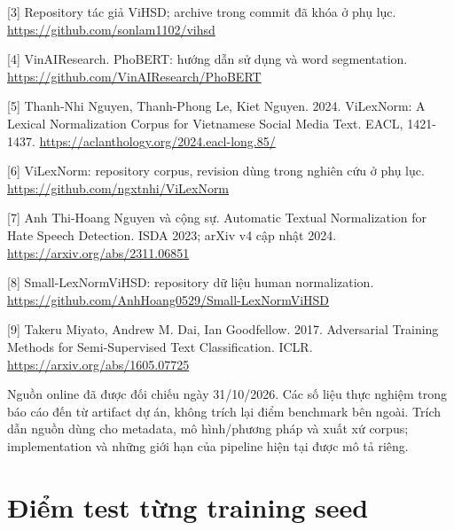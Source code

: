\documentclass[11pt,a4paper]{article}
\begin{document}
[3] Repository tác giả ViHSD; archive trong commit đã khóa ở phụ lục. \url{https://github.com/sonlam1102/vihsd}


[4] VinAIResearch. PhoBERT: hướng dẫn sử dụng và word segmentation. \url{https://github.com/VinAIResearch/PhoBERT}


[5] Thanh-Nhi Nguyen, Thanh-Phong Le, Kiet Nguyen. 2024. ViLexNorm: A Lexical Normalization Corpus for Vietnamese Social Media Text. EACL, 1421-1437. \url{https://aclanthology.org/2024.eacl-long.85/}


[6] ViLexNorm: repository corpus, revision dùng trong nghiên cứu ở phụ lục. \url{https://github.com/ngxtnhi/ViLexNorm}


[7] Anh Thi-Hoang Nguyen và cộng sự. Automatic Textual Normalization for Hate Speech Detection. ISDA 2023; arXiv v4 cập nhật 2024. \url{https://arxiv.org/abs/2311.06851}


[8] Small-LexNormViHSD: repository dữ liệu human normalization. \url{https://github.com/AnhHoang0529/Small-LexNormViHSD}


[9] Takeru Miyato, Andrew M. Dai, Ian Goodfellow. 2017. Adversarial Training Methods for Semi-Supervised Text Classification. ICLR. \url{https://arxiv.org/abs/1605.07725}


Nguồn online đã được đối chiếu ngày 31/10/2026. Các số liệu thực nghiệm trong báo cáo đến từ artifact dự án, không trích lại điểm benchmark bên ngoài. Trích dẫn nguồn dùng cho metadata, mô hình/phương pháp và xuất xứ corpus; implementation và những giới hạn của pipeline hiện tại được mô tả riêng.


\appendix

\FloatBarrier\section{Điểm test từng training seed}
\end{document}
